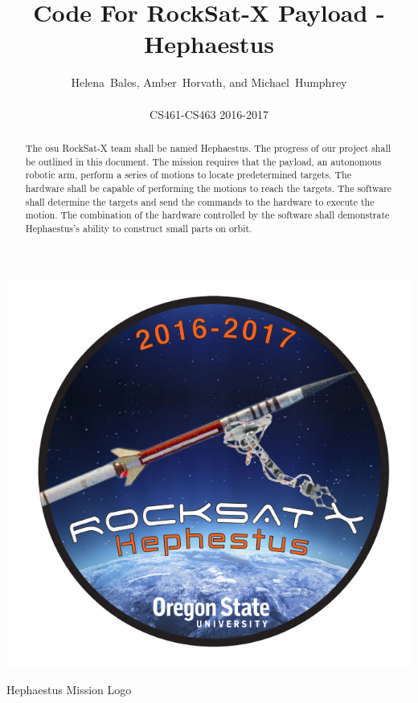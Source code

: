 \documentclass[letterpaper,10pt]{article}
\title{Code For RockSat-X Payload - Hephaestus}
\author{Helena~Bales, Amber~Horvath, and Michael~Humphrey\\ \\ CS461-CS463 2016-2017}
\begin{document}
\maketitle

\begin{abstract}
The osu RockSat-X team shall be named Hephaestus.
The progress of our project shall be outlined in this document.
The mission requires that the payload, an autonomous robotic arm, perform a series of motions to locate predetermined targets.
The hardware shall be capable of performing the motions to reach the targets.
The software shall determine the targets and send the commands to the hardware to execute the motion.
The combination of the hardware controlled by the software shall demonstrate Hephaestus's ability to construct small parts on orbit.
\end{abstract}

\begin{center}
\includegraphics[scale=.3]{logo}

Hephaestus Mission Logo
\end{center}
\end{document}
